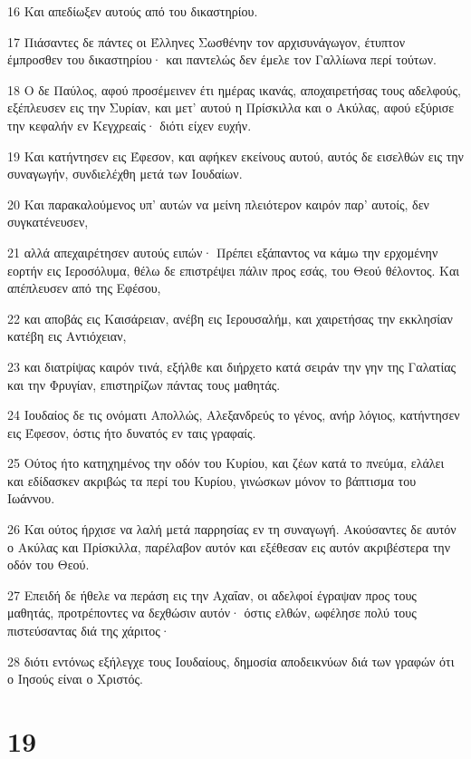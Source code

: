 \par 16 Και απεδίωξεν αυτούς από του δικαστηρίου.
\par 17 Πιάσαντες δε πάντες οι Έλληνες Σωσθένην τον αρχισυνάγωγον, έτυπτον έμπροσθεν του δικαστηρίου· και παντελώς δεν έμελε τον Γαλλίωνα περί τούτων.
\par 18 Ο δε Παύλος, αφού προσέμεινεν έτι ημέρας ικανάς, αποχαιρετήσας τους αδελφούς, εξέπλευσεν εις την Συρίαν, και μετ' αυτού η Πρίσκιλλα και ο Ακύλας, αφού εξύρισε την κεφαλήν εν Κεγχρεαίς· διότι είχεν ευχήν.
\par 19 Και κατήντησεν εις Έφεσον, και αφήκεν εκείνους αυτού, αυτός δε εισελθών εις την συναγωγήν, συνδιελέχθη μετά των Ιουδαίων.
\par 20 Και παρακαλούμενος υπ' αυτών να μείνη πλειότερον καιρόν παρ' αυτοίς, δεν συγκατένευσεν,
\par 21 αλλά απεχαιρέτησεν αυτούς ειπών· Πρέπει εξάπαντος να κάμω την ερχομένην εορτήν εις Ιεροσόλυμα, θέλω δε επιστρέψει πάλιν προς εσάς, του Θεού θέλοντος. Και απέπλευσεν από της Εφέσου,
\par 22 και αποβάς εις Καισάρειαν, ανέβη εις Ιερουσαλήμ, και χαιρετήσας την εκκλησίαν κατέβη εις Αντιόχειαν,
\par 23 και διατρίψας καιρόν τινά, εξήλθε και διήρχετο κατά σειράν την γην της Γαλατίας και την Φρυγίαν, επιστηρίζων πάντας τους μαθητάς.
\par 24 Ιουδαίος δε τις ονόματι Απολλώς, Αλεξανδρεύς το γένος, ανήρ λόγιος, κατήντησεν εις Έφεσον, όστις ήτο δυνατός εν ταις γραφαίς.
\par 25 Ούτος ήτο κατηχημένος την οδόν του Κυρίου, και ζέων κατά το πνεύμα, ελάλει και εδίδασκεν ακριβώς τα περί του Κυρίου, γινώσκων μόνον το βάπτισμα του Ιωάννου.
\par 26 Και ούτος ήρχισε να λαλή μετά παρρησίας εν τη συναγωγή. Ακούσαντες δε αυτόν ο Ακύλας και Πρίσκιλλα, παρέλαβον αυτόν και εξέθεσαν εις αυτόν ακριβέστερα την οδόν του Θεού.
\par 27 Επειδή δε ήθελε να περάση εις την Αχαΐαν, οι αδελφοί έγραψαν προς τους μαθητάς, προτρέποντες να δεχθώσιν αυτόν· όστις ελθών, ωφέλησε πολύ τους πιστεύσαντας διά της χάριτος·
\par 28 διότι εντόνως εξήλεγχε τους Ιουδαίους, δημοσία αποδεικνύων διά των γραφών ότι ο Ιησούς είναι ο Χριστός.

\chapter{19}

